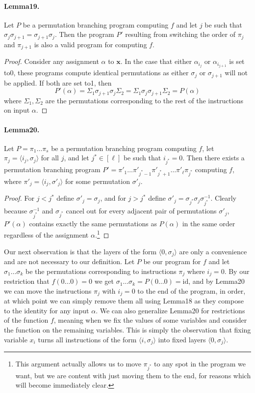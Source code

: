 \documentclass[10pt,a4paper]{article}
\begin{document}
\paragraph{Lemma19.} Let $P$ be a permutation branching program computing $f$ and let $j$ be such that $\sigma_j\sigma_{j+1}=\sigma_{j+1}\sigma_j$. Then the program $P'$ resulting from switching the order of $\pi_j$ and $\pi_{j+1}$ is also a valid program for computing $f$.
\begin{proof}
Consider any assignment $\alpha$ to $\mathbf x$. In the case that either $\alpha_{i_j}$ or $\alpha_{i_{j+1}}$ is set to0, these programs compute identical permutations as either $\sigma_j$ or $\sigma_{j+1}$ will not be applied. If both are set to1, then
\[P'(\alpha)=\Sigma_1\sigma_{j+1}\sigma_j\Sigma_2=\Sigma_1\sigma_j\sigma_{j+1}\Sigma_2=P(\alpha)\]
where $\Sigma_1,\Sigma_2$ are the permutations corresponding to the rest of the instructions on input $\alpha$.
\end{proof}
\paragraph{Lemma20.} Let $P=\pi_1\ldots\pi_s$ be a permutation branching program computing $f$, let $\pi_j=\langle i_j,\sigma_j\rangle$ for all $j$, and let $j^*\in[\ell]$ be such that $i_{j^*}=0$. Then there exists a permutation branching program $P'=\pi'_1\ldots\pi'_{j^*-1}\pi'_{j^*+1}\ldots\pi'_{\ell}\pi_{j^*}$ computing $f$, where $\pi'_j=\langle i_j,\sigma'_j\rangle$ for some permutation $\sigma'_j$.
\begin{proof}
For $j<j^*$ define $\sigma'_j=\sigma_j$, and for $j>j^*$ define $\sigma'_j=\sigma_{j^*}\sigma_j\sigma_{j^*}^{-1}$. Clearly because $\sigma_{j^*}^{-1}$ and $\sigma_{j^*}$ cancel out for every adjacent pair of permutations $\sigma'_j$, $P'(\alpha)$ contains exactly the same permutations as $P(\alpha)$ in the same order regardless of the assignment $\alpha$.\footnote{This argument actually allows us to move $\pi_{j^*}$ to any spot in the program we want, but we are content with just moving them to the end, for reasons which will become immediately clear.}
\end{proof}
Our next observation is that the layers of the form $\langle0,\sigma_j\rangle$ are only a convenience and are not necessary to our definition. Let $P$ be our program for $f$ and let $\sigma_1\ldots\sigma_k$ be the permutations corresponding to instructions $\pi_j$ where $i_j=0$. By our restriction that $f(0\ldots0)=0$ we get $\sigma_1\ldots\sigma_k=P(0\ldots0)=\mathrm{id}$, and by Lemma20 we can move the instructions $\pi_j$ with $i_j=0$ to the end of the program, in order, at which point we can simply remove them all using Lemma18 as they compose to the identity for any input $\alpha$.
We can also generalize Lemma20 for restrictions of the function $f$, meaning when we fix the values of some variables and consider the function on the remaining variables. This is simply the observation that fixing variable $x_i$ turns all instructions of the form $\langle i,\sigma_j\rangle$ into fixed layers $\langle0,\sigma_j\rangle$.
\end{document}
